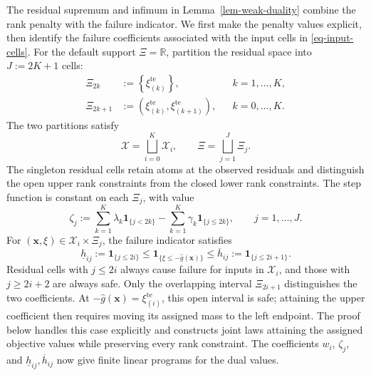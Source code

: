 \documentclass[review,11pt,3p,authoryear,nopreprintline]{elsarticle}
\begin{document}
The residual supremum and infimum in Lemma~\ref{lem-weak-duality} combine the rank penalty with the failure indicator. We first make the penalty values explicit, then identify the failure coefficients associated with the input cells in \eqref{eq-input-cells}. For the default support $\Xi=\mathbb R$, partition the residual space into $J:=2K+1$ cells:
\begin{equation}
  \begin{aligned}
    \Xi_{2k}&:=\left\{\xi_{(k)}^{\mathrm{te}}\right\},
      &&k=1,\ldots,K,\\
    \Xi_{2k+1}&:=\left(\xi_{(k)}^{\mathrm{te}},\xi_{(k+1)}^{\mathrm{te}}\right),
      &&k=0,\ldots,K.
  \end{aligned}
  \label{eq-residual-cells}
\end{equation}
The two partitions satisfy
\begin{equation}
  \mathcal X=\bigsqcup_{i=0}^K\mathcal X_i,
  \qquad
  \Xi=\bigsqcup_{j=1}^J\Xi_j.
  \label{eq-space-partitions}
\end{equation}
The singleton residual cells retain atoms at the observed residuals and distinguish the open upper rank constraints from the closed lower rank constraints. The step function is constant on each $\Xi_j$, with value
\begin{equation}
  \zeta_j:=\sum_{k=1}^K\lambda_k\mathbf1_{\{j<2k\}}
    -\sum_{k=1}^K\gamma_k\mathbf1_{\{j\le2k\}},
    \qquad j=1,\ldots,J.
  \label{eq-dual-cell-values}
\end{equation}
For $(\bm x,\xi)\in\mathcal X_i\times\Xi_j$, the failure indicator satisfies
\begin{equation}
  \underline h_{ij}:=\mathbf1_{\{j\le2i\}}
  \le\mathbf1_{\{\xi\le-\hat g(\bm x)\}}
  \le\overline h_{ij}:=\mathbf1_{\{j\le2i+1\}}.
  \label{eq-cell-costs}
\end{equation}
Residual cells with $j\le2i$ always cause failure for inputs in $\mathcal X_i$, and those with $j\ge2i+2$ are always safe. Only the overlapping interval $\Xi_{2i+1}$ distinguishes the two coefficients. At $-\hat g(\bm x)=\xi_{(i)}^{\mathrm{te}}$, this open interval is safe; attaining the upper coefficient then requires moving its assigned mass to the left endpoint. The proof below handles this case explicitly and constructs joint laws attaining the assigned objective values while preserving every rank constraint. The coefficients $w_i$, $\zeta_j$, and $\underline h_{ij},\overline h_{ij}$ now give finite linear programs for the dual values.
\end{document}
